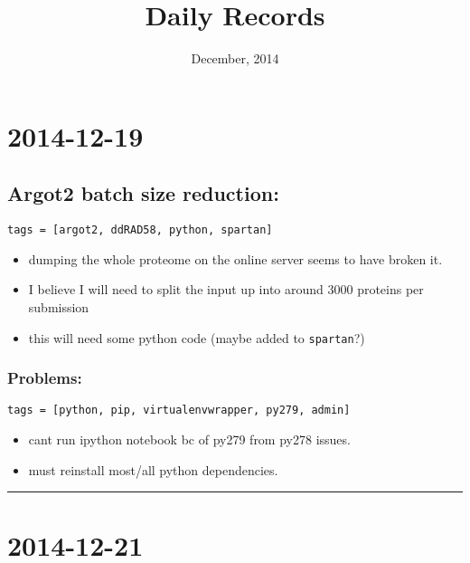 \documentclass[letterpaper]{scrartcl}
\title{Daily Records\\\vspace{0.5em}{\large Caccone PostDoc}}
\date{December, 2014}
\begin{document}
\maketitle

{
\hypersetup{linkcolor=black}
\setcounter{tocdepth}{3}
\tableofcontents
}
\section{2014-12-19}\label{section}

\subsection{Argot2 batch size
reduction:}\label{argot2-batch-size-reduction}

\begin{verbatim}
tags = [argot2, ddRAD58, python, spartan]
\end{verbatim}

\begin{itemize}
\itemsep1pt\parskip0pt
\item
  dumping the whole proteome on the online server seems to have broken
  it.
\item
  I believe I will need to split the input up into around 3000 proteins
  per submission
\item
  this will need some python code (maybe added to \texttt{spartan}?)
\end{itemize}

\subsubsection{Problems:}\label{problems}

\begin{verbatim}
tags = [python, pip, virtualenvwrapper, py279, admin]
\end{verbatim}

\begin{itemize}
\itemsep1pt\parskip0pt
\item
  cant run ipython notebook bc of py279 from py278 issues.
\item
  must reinstall most/all python dependencies.
\end{itemize}

\begin{center}\rule{0.5\linewidth}{\linethickness}\end{center}

\section{2014-12-21}\label{section-1}
\end{document}
